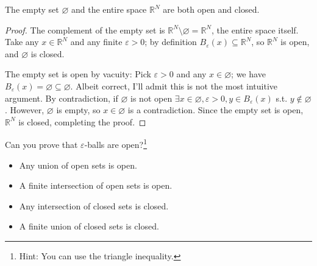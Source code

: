 \documentclass{article}
\begin{document}
\begin{claim}
  The empty set $\varnothing$ and the entire space $\mathbb{R}^N$ are both open and closed.
\end{claim}

\begin{proof}
  The complement of  the empty set is $\mathbb{R}^N \setminus \varnothing = \mathbb{R}^N$, the entire space itself. Take any $x \in \mathbb{R}^N$ and any finite $\varepsilon > 0$; by definition $B_{\varepsilon}(x) \subseteq \mathbb{R}^N$, so $\mathbb{R}^N$ is open, and $\varnothing$ is closed.

  The empty set is open by vacuity: Pick $\varepsilon > 0$ and any $x \in \varnothing$; we have $B_{\varepsilon}(x) = \varnothing \subseteq \varnothing$. Albeit correct, I'll admit this is not  the most intuitive argument. By contradiction, if $\varnothing$ is not open $\exists x \in \varnothing, \varepsilon > 0, y \in B_{\varepsilon}(x)$ s.t. $y \notin \varnothing$. However, $\varnothing$ is empty, so $x \in \varnothing$ is a contradiction. Since the empty set is open, $\mathbb{R}^N$ is closed, completing the proof.
\end{proof}

Can you prove that $\varepsilon$-balls are open?\footnote{Hint: You can use the triangle inequality.}
\begin{claim}
  \begin{itemize}[label=$\bullet$]
    \item Any union of open sets is open.

    \item A finite intersection of open sets is open.

    \item Any intersection of closed sets is closed.

    \item A finite union of closed sets is closed.
  \end{itemize}
\end{claim}
\end{document}
